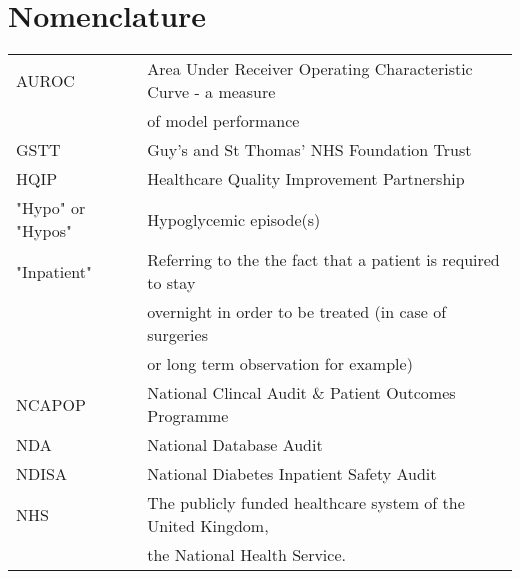 \section*{Nomenclature}

\begin{flushleft}
\begin{minipage}{1\textwidth}
    	\centering
        \def\arraystretch{1.25}%
    	\begin{tabular}{ll}

			AUROC & Area Under Receiver Operating Characteristic Curve - a measure \\
			& of model performance \\
			GSTT  & Guy's and St Thomas' NHS Foundation Trust \\
			HQIP & Healthcare Quality Improvement Partnership \\
			"Hypo" or "Hypos" & Hypoglycemic episode(s) \\

			"Inpatient" & Referring to the the fact that a patient is required to stay \\ 
			& overnight in order to be treated (in case of surgeries \\  
			& or long term observation for example) \\

			NCAPOP & National Clincal Audit \& Patient Outcomes Programme \\
			NDA   & National Database Audit  \\
    		NDISA & National Diabetes Inpatient Safety Audit \\  
    		NHS & The publicly funded healthcare system of the United Kingdom, \\ 
            & the National Health Service. \\
			                
    	\end{tabular}
\end{minipage}

\end{flushleft}

